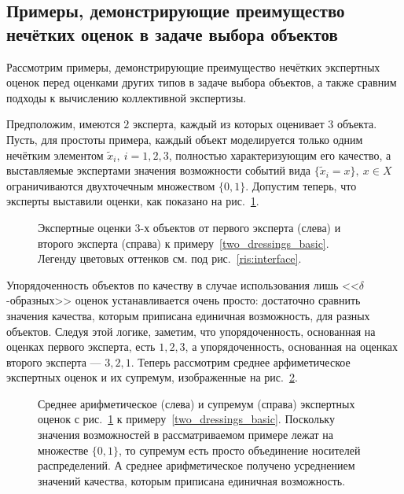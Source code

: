 \subsection{Примеры, демонстрирующие преимущество нечётких оценок в задаче выбора объектов}

Рассмотрим примеры, демонстрирующие преимущество нечётких экспертных оценок перед оценками других типов в задаче выбора объектов, а также сравним подходы к вычислению коллективной экспертизы.
\begin{example}
\label{two_dressings_basic}
Предположим, имеются $2$ эксперта, каждый из которых оценивает $3$ объекта. Пусть, для простоты примера, каждый объект моделируется только одним нечётким элементом $\tilde x_i,\ i=1,2,3$, полностью характеризующим его качество, а выставляемые экспертами значения возможности событий вида  $\{\tilde x_i = x\},\ x \in X$ ограничиваются двухточечным множеством $\{0, 1\}$. Допустим теперь, что эксперты выставили оценки, как показано на рис.~\ref{two_dressings_source}.
\end{example}

\begin{figure}[h]
\caption{\small Экспертные оценки $3$-х объектов от первого эксперта (слева) и второго эксперта (справа) к примеру~\ref{two_dressings_basic}. Легенду цветовых оттенков см. под рис.~\ref{ris:interface}. }
\label{two_dressings_source}
\end{figure}

Упорядоченность объектов по качеству в случае использования лишь <<$\delta$-образных>> оценок устанавливается очень просто: достаточно сравнить значения качества, которым приписана единичная возможность, для разных объектов. Следуя этой логике, заметим, что упорядоченность, основанная на оценках первого эксперта, есть $1, 2, 3$, а упорядоченность, основанная на оценках второго эксперта --- $3, 2, 1$. Теперь рассмотрим среднее арфиметическое экспертных оценок и их супремум, изображенные на рис.~\ref{two_dressings_mean}.

\begin{figure}[h]
\caption{\small Среднее арифметическое (слева) и супремум (справа) экспертных оценок с рис.~\ref{two_dressings_source} к примеру~\ref{two_dressings_basic}. Поскольку значения возможностей в рассматриваемом примере лежат на множестве $\{0, 1\}$, то супремум есть просто объединение носителей распределений. А среднее арифметическое получено усреднением значений качества, которым приписана единичная возможность.}
\label{two_dressings_mean}
\end{figure}

